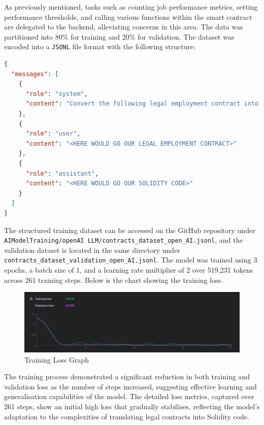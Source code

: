 As previously mentioned, tasks such as counting job performance metrics, setting performance thresholds, and calling various functions within the smart contract are delegated to the backend, alleviating concerns in this area. The data was partitioned into 80\% for training and 20\% for validation. The dataset was encoded into a \texttt{JSONL} file format with the following structure:

\begin{lstlisting}[language=json, caption={Example JSON Configuration}]
{
  "messages": [
    {
      "role": "system",
      "content": "Convert the following legal employment contract into a Solidity smart contract. You shall pass back only code!"
    },
    {
      "role": "user",
      "content": "<HERE WOULD GO OUR LEGAL EMPLOYMENT CONTRACT>"
    },
    {
      "role": "assistant",
      "content": "<HERE WOULD GO OUR SOLIDITY CODE>"
    }
  ]
}
\end{lstlisting}

The structured training dataset can be accessed on the GitHub repository under \texttt{AIModelTraining/openAI LLM/contracts\_dataset\_open\_AI.jsonl}, and the validation dataset is located in the same directory under \texttt{contracts\_dataset\_validation\_open\_AI.jsonl}. The model was trained using 3 epochs, a batch size of 1, and a learning rate multiplier of 2 over 519,231 tokens across 261 training steps. Below is the chart showing the training loss.

\begin{figure}[!ht]
    \centering
    \includegraphics[width=1\textwidth]{LATEX/Appendices/Images/Software/AI Model/training_validation_loss_graph.png}
    \caption{Training Loss Graph}
    \label{fig:training_loss_graph}
\end{figure}

The training process demonstrated a significant reduction in both training and validation loss as the number of steps increased, suggesting effective learning and generalisation capabilities of the model. The detailed loss metrics, captured over 261 steps, show an initial high loss that gradually stabilises, reflecting the model’s adaptation to the complexities of translating legal contracts into Solidity code.

